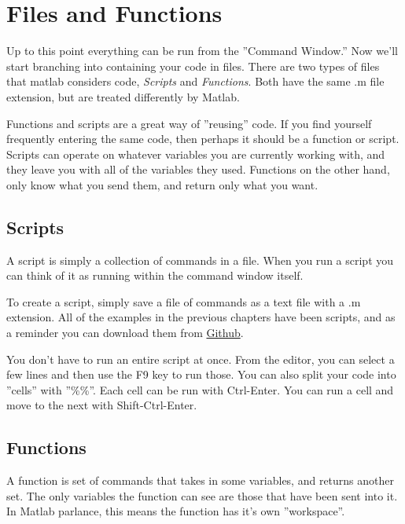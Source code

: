 
\section{Files and Functions}
Up to this point everything can be run from the ''Command Window.''
 Now we'll start branching into containing your code in files.
 There are two types of files that matlab considers code, \emph{Scripts} and \emph{Functions}.
 Both have the same .m file extension, but are treated differently by Matlab.
 
Functions and scripts are a great way of ''reusing'' code.
 If you find yourself frequently entering the same code, then perhaps it should be a function or script.
 Scripts can operate on whatever variables you are currently working with, and they leave you with all of the variables they used.
 Functions on the other hand, only know what you send them, and return only what you want.

\subsection{Scripts}
A script is simply a collection of commands in a file.
 When you run a script you can think of it as running within the command window itself.
 
To create a script, simply save a file of commands as a text file with a .m extension.
 All of the examples in the previous chapters have been scripts, and as a reminder you can download them from \href{https://github.com/KEClaytor/QuickDirtyMatlab/tree/master/code}{Github}.

\begin{quote}

\end{quote}

You don't have to run an entire script at once.
 From the editor, you can select a few lines and then use the F9 key to run those.
 You can also split your code into ''cells'' with ''\%\%''.
 Each cell can be run with Ctrl-Enter.
 You can run a cell and move to the next with Shift-Ctrl-Enter.

\begin{quote}

\end{quote}

\pagebreak
\subsection{Functions}
A function is set of commands that takes in some variables, and returns another set.
 The only variables the function can see are those that have been sent into it.
 In Matlab parlance, this means the function has it's own ''workspace''.
  
